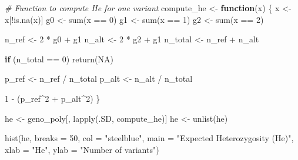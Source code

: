 \documentclass[
]{article}
\newenvironment{Shaded}{\begin{snugshade}}{\end{snugshade}}
\newcommand{\AttributeTok}[1]{\textcolor[rgb]{0.77,0.63,0.00}{#1}}
\newcommand{\CommentTok}[1]{\textcolor[rgb]{0.56,0.35,0.01}{\textit{#1}}}
\newcommand{\ConstantTok}[1]{\textcolor[rgb]{0.00,0.00,0.00}{#1}}
\newcommand{\ControlFlowTok}[1]{\textcolor[rgb]{0.13,0.29,0.53}{\textbf{#1}}}
\newcommand{\DecValTok}[1]{\textcolor[rgb]{0.00,0.00,0.81}{#1}}
\newcommand{\FunctionTok}[1]{\textcolor[rgb]{0.00,0.00,0.00}{#1}}
\newcommand{\NormalTok}[1]{#1}
\newcommand{\OtherTok}[1]{\textcolor[rgb]{0.56,0.35,0.01}{#1}}
\newcommand{\SpecialCharTok}[1]{\textcolor[rgb]{0.00,0.00,0.00}{#1}}
\newcommand{\StringTok}[1]{\textcolor[rgb]{0.31,0.60,0.02}{#1}}
\begin{document}
\begin{Shaded}
\begin{Highlighting}[]
\CommentTok{\# Function to compute He for one variant}
\NormalTok{compute\_he }\OtherTok{\textless{}{-}} \ControlFlowTok{function}\NormalTok{(x) \{}
\NormalTok{  x }\OtherTok{\textless{}{-}}\NormalTok{ x[}\SpecialCharTok{!}\FunctionTok{is.na}\NormalTok{(x)]}
\NormalTok{  g0 }\OtherTok{\textless{}{-}} \FunctionTok{sum}\NormalTok{(x }\SpecialCharTok{==} \DecValTok{0}\NormalTok{)}
\NormalTok{  g1 }\OtherTok{\textless{}{-}} \FunctionTok{sum}\NormalTok{(x }\SpecialCharTok{==} \DecValTok{1}\NormalTok{)}
\NormalTok{  g2 }\OtherTok{\textless{}{-}} \FunctionTok{sum}\NormalTok{(x }\SpecialCharTok{==} \DecValTok{2}\NormalTok{)}
  
\NormalTok{  n\_ref }\OtherTok{\textless{}{-}} \DecValTok{2} \SpecialCharTok{*}\NormalTok{ g0 }\SpecialCharTok{+}\NormalTok{ g1}
\NormalTok{  n\_alt }\OtherTok{\textless{}{-}} \DecValTok{2} \SpecialCharTok{*}\NormalTok{ g2 }\SpecialCharTok{+}\NormalTok{ g1}
\NormalTok{  n\_total }\OtherTok{\textless{}{-}}\NormalTok{ n\_ref }\SpecialCharTok{+}\NormalTok{ n\_alt}
  
  \ControlFlowTok{if}\NormalTok{ (n\_total }\SpecialCharTok{==} \DecValTok{0}\NormalTok{) }\FunctionTok{return}\NormalTok{(}\ConstantTok{NA}\NormalTok{)}
  
\NormalTok{  p\_ref }\OtherTok{\textless{}{-}}\NormalTok{ n\_ref }\SpecialCharTok{/}\NormalTok{ n\_total}
\NormalTok{  p\_alt }\OtherTok{\textless{}{-}}\NormalTok{ n\_alt }\SpecialCharTok{/}\NormalTok{ n\_total}
  
  \DecValTok{1} \SpecialCharTok{{-}}\NormalTok{ (p\_ref}\SpecialCharTok{\^{}}\DecValTok{2} \SpecialCharTok{+}\NormalTok{ p\_alt}\SpecialCharTok{\^{}}\DecValTok{2}\NormalTok{)}
\NormalTok{\}}

\NormalTok{he }\OtherTok{\textless{}{-}}\NormalTok{ geno\_poly[, }\FunctionTok{lapply}\NormalTok{(.SD, compute\_he)]}
\NormalTok{he }\OtherTok{\textless{}{-}} \FunctionTok{unlist}\NormalTok{(he)}

\FunctionTok{hist}\NormalTok{(he,}
     \AttributeTok{breaks =} \DecValTok{50}\NormalTok{,}
     \AttributeTok{col =} \StringTok{"steelblue"}\NormalTok{,}
     \AttributeTok{main =} \StringTok{"Expected Heterozygosity (He)"}\NormalTok{,}
     \AttributeTok{xlab =} \StringTok{"He"}\NormalTok{,}
     \AttributeTok{ylab =} \StringTok{"Number of variants"}\NormalTok{)}
\end{Highlighting}
\end{Shaded}
\end{document}
